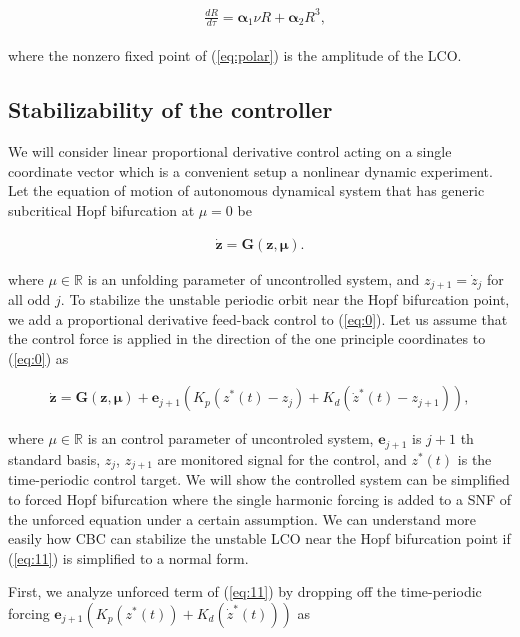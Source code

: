 \documentclass[openacc]{rsproca_new}%
\def\real{\mathbb{R}}
\def\vec#1{\ensuremath{\mathbf{#1}}}
\newcommand{\Eref}[1]{(\ref{#1})}
\begin{document}
\begin{align}\label{eq:polar}
  \begin{split}
    &\frac{dR}{d\tau}=\vec{\alpha}_1 \nu R+\vec{\alpha}_2 R^3,
  \end{split}
\end{align}

\noindent where the nonzero fixed point of \Eref{eq:polar} is the amplitude of the LCO.

\subsection{Stabilizability of the controller}

We will consider linear proportional derivative control acting on a single coordinate vector which is a convenient setup a nonlinear dynamic experiment. Let the equation of motion of autonomous dynamical system that has  generic subcritical Hopf bifurcation at $\mu=0$ be

\begin{align}\label{eq:0}
    \dot{\vec{z}} =\vec{G}(\vec{z},\vec{\mu}).
\end{align}

\noindent where $\mu\in \real$ is an unfolding parameter of uncontrolled system, and $z_{j+1}=\dot z_j$ for all odd $j$. To stabilize the unstable periodic orbit near the Hopf bifurcation point, we add a proportional derivative feed-back control to \Eref{eq:0}. Let us assume that the control force is applied in the direction of the one principle coordinates to \Eref{eq:0} as

\begin{align}\label{eq:11}
    \dot{\vec{z}} =\vec{G}(\vec{z},\vec{\mu})+\vec{e}_{j+1}(K_p(z^*(t)-z_j)+K_d(\dot z^*(t)-z_{j+1})),
\end{align}

\noindent where $\mu\in \real$ is an control parameter of uncontroled system, $\vec{e}_{j+1}$ is $j+1$ th standard basis, $z_{j}$, $z_{j+1}$ are monitored signal for the control, and $z^*(t)$  is the time-periodic control target. We will show the controlled system can be simplified to forced Hopf bifurcation where the single harmonic forcing is added to a SNF of the unforced equation under a certain assumption. We can understand more easily how CBC can stabilize the unstable LCO near the Hopf bifurcation point if \Eref{eq:11} is simplified to a normal form.

First, we analyze unforced term of \Eref{eq:11} by dropping off the time-periodic forcing $\vec{e}_{j+1}(K_p(z^*(t))+K_d(\dot z^*(t)))$ as
\end{document}
